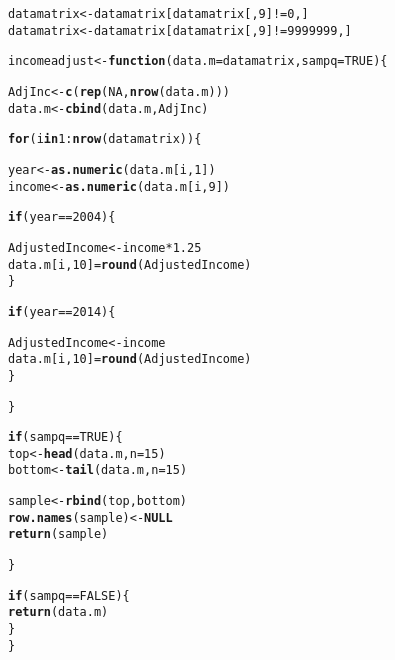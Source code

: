 \documentclass{article}\usepackage[]{graphicx}\usepackage[]{color}
\makeatletter
\newcommand{\hlnum}[1]{\textcolor[rgb]{0.686,0.059,0.569}{#1}}%
\newcommand{\hlopt}[1]{\textcolor[rgb]{0,0,0}{#1}}%
\newcommand{\hlstd}[1]{\textcolor[rgb]{0.345,0.345,0.345}{#1}}%
\newcommand{\hlkwa}[1]{\textcolor[rgb]{0.161,0.373,0.58}{\textbf{#1}}}%
\newcommand{\hlkwb}[1]{\textcolor[rgb]{0.69,0.353,0.396}{#1}}%
\newcommand{\hlkwc}[1]{\textcolor[rgb]{0.333,0.667,0.333}{#1}}%
\newcommand{\hlkwd}[1]{\textcolor[rgb]{0.737,0.353,0.396}{\textbf{#1}}}%
\newenvironment{kframe}{%
 \def\at@end@of@kframe{}%
 \ifinner\ifhmode%
  \def\at@end@of@kframe{\end{minipage}}%
  \begin{minipage}{\columnwidth}%
 \fi\fi%
 \def\FrameCommand##1{\hskip\@totalleftmargin \hskip-\fboxsep
 \colorbox{shadecolor}{##1}\hskip-\fboxsep
     \hskip-\linewidth \hskip-\@totalleftmargin \hskip\columnwidth}%
 \MakeFramed {\advance\hsize-\width
   \@totalleftmargin\z@ \linewidth\hsize
   \@setminipage}}%
 {\par\unskip\endMakeFramed%
 \at@end@of@kframe}
\newenvironment{knitrout}{}{} %
\makeatother
\begin{document}
\begin{knitrout}
\begin{kframe}
\begin{alltt}
\hlstd{datamatrix} \hlkwb{<-} \hlstd{datamatrix[datamatrix[,}\hlnum{9}\hlstd{]}\hlopt{!=} \hlnum{0}\hlstd{,]}
\hlstd{datamatrix} \hlkwb{<-} \hlstd{datamatrix[datamatrix[,}\hlnum{9}\hlstd{]}\hlopt{!=} \hlnum{9999999}\hlstd{,]}



\hlstd{incomeadjust} \hlkwb{<-} \hlkwa{function}\hlstd{(}\hlkwc{data.m} \hlstd{= datamatrix,} \hlkwc{sampq} \hlstd{=} \hlnum{TRUE}\hlstd{)\{}

  \hlstd{AdjInc} \hlkwb{<-} \hlkwd{c}\hlstd{(}\hlkwd{rep}\hlstd{(}\hlnum{NA}\hlstd{,} \hlkwd{nrow}\hlstd{(data.m)))}
  \hlstd{data.m} \hlkwb{<-} \hlkwd{cbind}\hlstd{(data.m, AdjInc)}

  \hlkwa{for} \hlstd{(i} \hlkwa{in} \hlnum{1}\hlopt{:}\hlkwd{nrow}\hlstd{(datamatrix))\{}

    \hlstd{year} \hlkwb{<-} \hlkwd{as.numeric}\hlstd{(data.m[i,}\hlnum{1}\hlstd{])}
    \hlstd{income} \hlkwb{<-} \hlkwd{as.numeric}\hlstd{(data.m[i,}\hlnum{9}\hlstd{])}

    \hlkwa{if} \hlstd{(year} \hlopt{==} \hlnum{2004}\hlstd{)\{}

      \hlstd{AdjustedIncome} \hlkwb{<-} \hlstd{income} \hlopt{*} \hlnum{1.25}
      \hlstd{data.m[i,}\hlnum{10}\hlstd{]} \hlkwb{=} \hlkwd{round}\hlstd{(AdjustedIncome)}
    \hlstd{\}}

    \hlkwa{if} \hlstd{(year} \hlopt{==} \hlnum{2014}\hlstd{)\{}

      \hlstd{AdjustedIncome} \hlkwb{<-} \hlstd{income}
      \hlstd{data.m[i,}\hlnum{10}\hlstd{]} \hlkwb{=} \hlkwd{round}\hlstd{(AdjustedIncome)}
    \hlstd{\}}


  \hlstd{\}}

 \hlkwa{if} \hlstd{(sampq} \hlopt{==} \hlnum{TRUE}\hlstd{)\{}
  \hlstd{top} \hlkwb{<-} \hlkwd{head}\hlstd{(data.m,} \hlkwc{n}\hlstd{=}\hlnum{15}\hlstd{)}
  \hlstd{bottom}\hlkwb{<-} \hlkwd{tail}\hlstd{(data.m,} \hlkwc{n}\hlstd{=}\hlnum{15}\hlstd{)}

  \hlstd{sample} \hlkwb{<-} \hlkwd{rbind}\hlstd{(top,bottom)}
  \hlkwd{row.names}\hlstd{(sample)} \hlkwb{<-} \hlkwa{NULL}
  \hlkwd{return}\hlstd{(sample)}

 \hlstd{\}}

 \hlkwa{if} \hlstd{(sampq} \hlopt{==} \hlnum{FALSE}\hlstd{)\{}
   \hlkwd{return}\hlstd{(data.m)}
 \hlstd{\}}
\hlstd{\}}


\end{alltt}
\end{kframe}
\end{knitrout}
\end{document}
